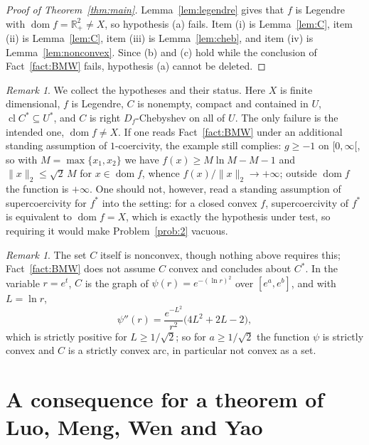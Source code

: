 \documentclass[11pt]{amsart}
\theoremstyle{plain}
\theoremstyle{definition}
\theoremstyle{remark}
\newtheorem{remark}[theorem]{Remark}
\newcommand{\R}{\mathbb{R}}
\newcommand{\dom}{\operatorname{dom}}
\newcommand{\cl}{\operatorname{cl}}
\newcommand{\D}{D_f}
\newcommand{\Cstar}{C^{*}}
\begin{document}
\begin{proof}[Proof of Theorem~\textup{\ref{thm:main}}]
Lemma~\ref{lem:legendre} gives that $f$ is Legendre with
$\dom f = \R^{2}_{+} \neq X$, so hypothesis (a) fails. Item (i) is
Lemma~\ref{lem:C}, item (ii) is Lemma~\ref{lem:C}, item (iii) is
Lemma~\ref{lem:cheb}, and item (iv) is Lemma~\ref{lem:nonconvex}. Since (b) and
(c) hold while the conclusion of Fact~\ref{fact:BMW} fails, hypothesis (a)
cannot be deleted.
\end{proof}

\begin{remark}\label{rem:audit}
We collect the hypotheses and their status. Here $X$ is finite dimensional, $f$
is Legendre, $C$ is nonempty, compact and contained in $U$,
$\cl \Cstar \subseteq U^{*}$, and $C$ is right $\D$-Chebyshev on all of $U$. The
only failure is the intended one, $\dom f \neq X$. If one reads
Fact~\ref{fact:BMW} under an additional standing assumption of $1$-coercivity,
the example still complies: $g \ge -1$ on $[0,\infty[$, so with
$M = \max\{x_{1},x_{2}\}$ we have $f(x) \ge M \ln M - M - 1$ and
$\lVert x \rVert_{2} \le \sqrt{2}\, M$ for $x \in \dom f$, whence
$f(x)/\lVert x \rVert_{2} \to +\infty$; outside $\dom f$ the function is
$+\infty$. One should not, however, read a standing assumption of
supercoercivity for $f^{*}$ into the setting: for a closed convex $f$,
supercoercivity of $f^{*}$ is equivalent to $\dom f = X$, which is exactly the
hypothesis under test, so requiring it would make Problem~\ref{prob:2} vacuous.
\end{remark}

\begin{remark}\label{rem:C-nonconvex}
The set $C$ itself is nonconvex, though nothing above requires this;
Fact~\ref{fact:BMW} does not assume $C$ convex and concludes about $\Cstar$. In
the variable $r = e^{t}$, $C$ is the graph of
$\psi(r) = e^{-(\ln r)^{2}}$ over $[e^{a}, e^{b}]$, and with $L = \ln r$,
\[
  \psi''(r) = \frac{e^{-L^{2}}}{r^{2}} \bigl( 4L^{2} + 2L - 2 \bigr),
\]
which is strictly positive for $L \ge 1/\sqrt2$; so for $a \ge 1/\sqrt2$ the
function $\psi$ is strictly convex and $C$ is a strictly convex arc, in
particular not convex as a set.
\end{remark}

\section{A consequence for a theorem of Luo, Meng, Wen and Yao}\label{sec:luo}
\end{document}
